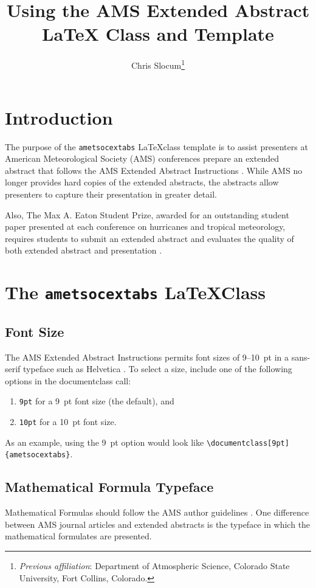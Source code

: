 \documentclass[9pt]{ametsocextabs}
\title{Using the AMS Extended Abstract LaTeX Class and Template}
\author{Chris Slocum\aff{a}\thanks{\textit{Previous affiliation}: Department of Atmospheric Science, Colorado State University, Fort Collins, Colorado.}\correspondingauthor{Chris Slocum, \url{https://github.com/CSlocumWX/}}
}
\affiliation{\aff{a}{Fort Collins, Colorado}}
\begin{document}
\maketitle
\section{Introduction}
The purpose of the \lowercase{\texttt{ametsocextabs}} \LaTeX class
template is to assist presenters at American Meteorological Society
(AMS) conferences prepare an extended abstract that follows the AMS
Extended Abstract Instructions \citep{AMS2025abs}. While AMS no
longer provides hard copies of the extended abstracts, the abstracts
allow presenters to capture their presentation in greater detail.

Also, The Max A. Eaton Student Prize, awarded for an outstanding
student paper presented at each conference on hurricanes and tropical
meteorology, requires students to submit an extended abstract and
evaluates the quality of both extended abstract and presentation
\citep{AMS2025student, AMS2025Eaton}.

\section{The \lowercase{\texttt{ametsocextabs}} \LaTeX Class}

\subsection{Font Size}

The AMS Extended Abstract Instructions permits font sizes of 9--10~pt
in a sans-serif typeface such as Helvetica \citep{AMS2025abs}.
To select a size, include one of the following options in the
documentclass call:
\begin{enumerate}
    \item \texttt{9pt} for a 9~pt font size (the default), and
    \item \texttt{10pt} for a 10~pt font size.
\end{enumerate}
As an example, using the 9~pt option would look like
\texttt{\textbackslash documentclass[9pt]\{ametsocextabs\}}.

\subsection{Mathematical Formula Typeface}
Mathematical Formulas should follow the AMS author guidelines
\citep{AMS2025math}. One difference between AMS journal articles
and extended abstracts is the typeface in which the mathematical
formulates are presented.
\end{document}
